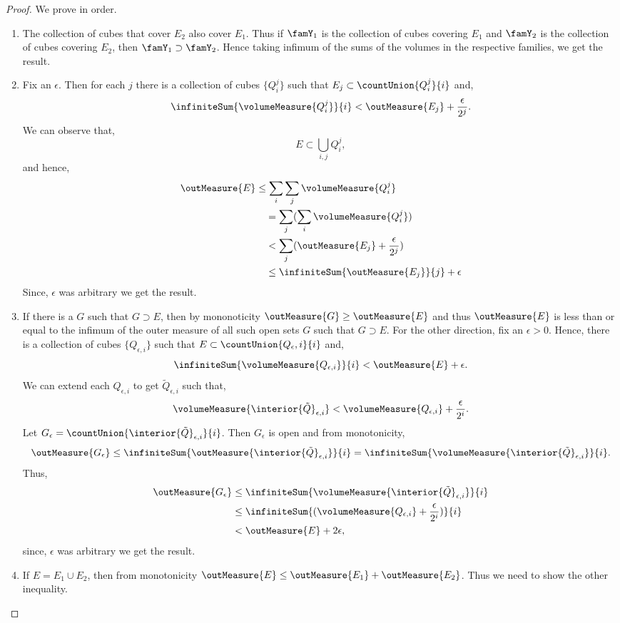 \begin{proof}
    We prove in order.
    \begin{enumerate}
	\item
	    The collection of cubes that cover $E_2$ also cover $E_1$. Thus if $\famY_1$ is the collection of
	    cubes covering $E_1$ and $\famY_2$ is the collection of cubes covering $E_2$, then $\famY_1
	    \supset \famY_2$. Hence taking infimum of the sums of the volumes in the respective families, 
	    we get the result.
	\item
	    Fix an $\epsilon$. Then for each $j$ there is a collection of cubes $\lbrace Q^{j}_i \rbrace$ such
	    that $E_j \subset \countUnion{Q^j_i}{i}$ and,
	    \[\infiniteSum{\volumeMeasure{Q^j_i}}{i} < \outMeasure{E_j} + \frac{\epsilon}{2^j}.\]
	    We can observe that,
	    \[E \subset \bigcup\limits_{i,j}Q^{j}_i,\]
	    and hence,
	    \begin{align*}
		\outMeasure{E} &\leq \sum\limits_{i}\sum\limits_{j}\volumeMeasure{Q^j_i} \\
		&\quad = \sum\limits_{j}(\sum\limits_{i}\volumeMeasure{Q^j_i}) \\
		&\quad < \sum\limits_{j}(\outMeasure{E_j} + \frac{\epsilon}{2^j})\\
		&\quad \leq \infiniteSum{\outMeasure{E_j}}{j} + \epsilon
	    \end{align*}
	    Since, $\epsilon$ was arbitrary we get the result.
	\item
	    If there is a $G$ such that $G \supset E$, then by mononoticity $\outMeasure{G} \geq \outMeasure{E}$ 
	    and thus $\outMeasure{E}$ is less than or equal to the infimum of the outer measure of all such open 
	    sets $G$ such that $G \supset E$. For the other direction, fix an $\epsilon > 0$. Hence, there is
	    a collection of cubes $\lbrace Q_{\epsilon,i}\rbrace$ such that $E \subset
	    \countUnion{Q_{\epsilon},i}{i}$ and,
	    \[\infiniteSum{\volumeMeasure{Q_{\epsilon,i}}}{i} < \outMeasure{E} + \epsilon.\]
	    We can extend each $Q_{\epsilon,i}$ to get $\tilde{Q}_{\epsilon,i}$ such that,
	    \[\volumeMeasure{\interior{\tilde{Q}}_{\epsilon,i}} < \volumeMeasure{Q_{\epsilon,i}} +
		\frac{\epsilon}{2^i}.\]
	    Let $G_{\epsilon} = \countUnion{\interior{\tilde{Q}}_{\epsilon,i}}{i}$. 
	    Then $G_{\epsilon}$ is open and from
	    monotonicity,
	    \[\outMeasure{G_{\epsilon}}\leq \infiniteSum{\outMeasure{\interior{\tilde{Q}}_{\epsilon,i}}}{i} = 
		\infiniteSum{\volumeMeasure{\interior{\tilde{Q}}_{\epsilon,i}}}{i}.\]
	    Thus,
	    \begin{align*}
		\outMeasure{G_{\epsilon}}&\leq
		\infiniteSum{\volumeMeasure{\interior{\tilde{Q}}_{\epsilon,i}}}{i} \\
		&\leq\infiniteSum{(\volumeMeasure{Q_{\epsilon,i}}+\frac{\epsilon}{2^i})}{i} \\
		& < \outMeasure{E} + 2\epsilon,
	    \end{align*}
	    since, $\epsilon$ was arbitrary we get the result.
	\item
	    If $E = E_1 \cup E_2$, then from monotonicity $\outMeasure{E} \leq \outMeasure{E_1} +
	    \outMeasure{E_2}$. Thus we need to show the other inequality.


\end{enumerate}
\end{proof}
